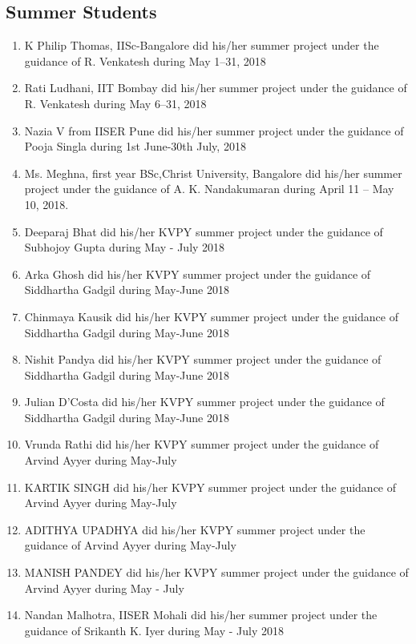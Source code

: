 

\subsection{Summer Students}

\begin{enumerate}
\item K Philip Thomas, IISc-Bangalore did his/her  summer project under the guidance of R. Venkatesh during May 1--31, 2018
\item Rati Ludhani, IIT Bombay did his/her  summer project under the guidance of R. Venkatesh during May 6--31, 2018
\item Nazia V from IISER Pune did his/her  summer project under the guidance of Pooja Singla during 1st June-30th July, 2018
\item      Ms. Meghna, first year BSc,Christ University, Bangalore did his/her  summer project under the guidance of A. K. Nandakumaran during April 11 – May 10, 2018. 
\item Deeparaj Bhat did his/her KVPY summer project under the guidance of Subhojoy Gupta during May - July 2018
\item Arka Ghosh did his/her KVPY summer project under the guidance of Siddhartha Gadgil during May-June 2018
\item Chinmaya Kausik did his/her KVPY summer project under the guidance of Siddhartha Gadgil during May-June 2018
\item Nishit Pandya did his/her KVPY summer project under the guidance of Siddhartha Gadgil during May-June 2018
\item Julian D'Costa did his/her KVPY summer project under the guidance of Siddhartha Gadgil during May-June 2018
\item Vrunda Rathi did his/her KVPY summer project under the guidance of Arvind Ayyer during May-July
\item KARTIK SINGH did his/her KVPY summer project under the guidance of Arvind Ayyer during May-July
\item ADITHYA UPADHYA  did his/her KVPY summer project under the guidance of Arvind Ayyer during May-July
\item MANISH PANDEY did his/her KVPY summer project under the guidance of Arvind Ayyer during May - July
\item Nandan Malhotra, IISER Mohali did his/her  summer project under the guidance of Srikanth K. Iyer during May - July 2018
\end{enumerate}



